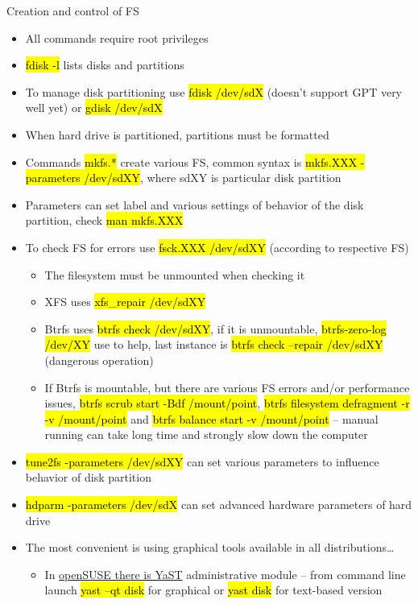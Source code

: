 \documentclass[compress, ucs, xelatex, 11pt, xcolor=svgnames,
  hyperref={
    bookmarks=true,
    unicode=true,
    colorlinks=true,
    pdftitle={Linux, command line and MetaCentrum},
    plainpages=false,
    pdfauthor={Vojtech Zeisek},
    pdfsubject={Course about use of Linux command line, writing shell scripts and using MetaCentrum of CESNET},
    pdfcreator={XeLaTeX},
    pdfkeywords={Linux, GNU, BASH, shell, command line, MetaCentrum},
    linkcolor=DarkRed,
    anchorcolor=DarkBlue,
    citecolor=Indigo,
    filecolor=NavyBlue,
    menucolor=DarkMagenta,
    urlcolor=DarkBlue,
    pdftex},
  url={hyphens, lowtilde} %
  ]{beamer}
\renewcommand{\texttt}[1]{\hl{\ttfamily #1}}
\begin{document}
\begin{frame}[allowframebreaks]{Creation and control of FS}
  \begin{itemize}
    \item All commands require root privileges
    \item \texttt{fdisk -l} lists disks and partitions
    \item To manage disk partitioning use \texttt{fdisk /dev/sdX} (doesn't support GPT very well yet) or \texttt{gdisk /dev/sdX}
    \item When hard drive is partitioned, partitions must be formatted
    \item Commands \texttt{mkfs.*} create various FS, common syntax is \texttt{mkfs.XXX -parameters /dev/sdXY}, where sdXY is particular disk partition
    \item Parameters can set label and various settings of behavior of the disk partition, check \texttt{man mkfs.XXX}
    \item To check FS for errors use \texttt{fsck.XXX /dev/sdXY} (according to respective FS)
    \begin{itemize}
      \item The filesystem must be unmounted when checking it
      \item XFS uses \texttt{xfs\_repair /dev/sdXY}
      \item Btrfs uses \texttt{btrfs check /dev/sdXY}, if it is unmountable, \texttt{btrfs-zero-log /dev/XY} use to help, last instance is \texttt{btrfs check --repair /dev/sdXY} (dangerous operation)
      \item If Btrfs is mountable, but there are various FS errors and/or performance issues, \texttt{btrfs scrub start -Bdf /mount/point}, \texttt{btrfs filesystem defragment -r -v /mount/point} and \texttt{btrfs balance start -v /mount/point} -- manual running can take long time and strongly slow down the computer
    \end{itemize}
    \item \texttt{tune2fs -parameters /dev/sdXY} can set various parameters to influence behavior of disk partition
    \item \texttt{hdparm -parameters /dev/sdX} can set advanced hardware parameters of hard drive
    \item The most convenient is using graphical tools available in all distributions\ldots
    \begin{itemize}
      \item In \href{https://doc.opensuse.org/documentation/leap/reference/html/book.opensuse.reference/cha.advdisk.html}{openSUSE there is YaST} administrative module -- from command line launch \texttt{yast --qt disk} for graphical or \texttt{yast disk} for text-based version

\end{itemize}
\end{itemize}
\end{frame}
\end{document}
